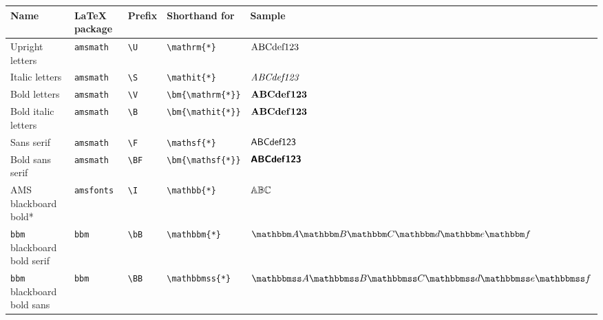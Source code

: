 \documentclass[]{article}
\begin{document}
\begin{table}[htbp]
  \hspace{-1.8cm}
  \begin{tabular}{p{14em} l l l l}
    \toprule
    Name & \LaTeX{} package & Prefix & Shorthand for & Sample \\
    \midrule
    Upright letters & \texttt{amsmath} & \verb+\U+ & \verb+\mathrm{*}+ & $\mathrm{A}\mathrm{B}\mathrm{C}\mathrm{d}\mathrm{e}\mathrm{f}\mathrm{1}\mathrm{2}\mathrm{3}$\\
    Italic letters & \texttt{amsmath} & \verb+\S+ & \verb+\mathit{*}+ & $\mathit{A}\mathit{B}\mathit{C}\mathit{d}\mathit{e}\mathit{f}\mathit{1}\mathit{2}\mathit{3}$ \\
    Bold letters & \texttt{amsmath} & \verb+\V+ & \verb+\bm{\mathrm{*}}+ & $\bm{\mathrm{A}}\bm{\mathrm{B}}\bm{\mathrm{C}}\bm{\mathrm{d}}\bm{\mathrm{e}}\bm{\mathrm{f}}\bm{\mathrm{1}}\bm{\mathrm{2}}\bm{\mathrm{3}}$ \\
    Bold italic letters & \texttt{amsmath} & \verb+\B+ & \verb+\bm{\mathit{*}}+ & $\bm{\mathrm{A}}\bm{\mathrm{B}}\bm{\mathrm{C}}\bm{\mathrm{d}}\bm{\mathrm{e}}\bm{\mathrm{f}}\bm{\mathrm{1}}\bm{\mathrm{2}}\bm{\mathrm{3}}$ \\
    Sans serif & \texttt{amsmath} & \verb+\F+ & \verb+\mathsf{*}+ & $\mathsf{A}\mathsf{B}\mathsf{C}\mathsf{d}\mathsf{e}\mathsf{f}\mathsf{1}\mathsf{2}\mathsf{3}$\\
    Bold sans serif & \texttt{amsmath} & \verb+\BF+ & \verb+\bm{\mathsf{*}}+ & $\bm{\mathsf{A}}\bm{\mathsf{B}}\bm{\mathsf{C}}\bm{\mathsf{d}}\bm{\mathsf{e}}\bm{\mathsf{f}}\bm{\mathsf{1}}\bm{\mathsf{2}}\bm{\mathsf{3}}$\\
    AMS blackboard bold* & \texttt{amsfonts} & \verb+\I+ & \verb+\mathbb{*}+ &
                                                                               $\mathbb{A}\mathbb{B}\mathbb{C}$ \\ %
    \texttt{bbm} blackboard bold serif & \texttt{bbm} & \verb+\bB+ & \verb+\mathbbm{*}+ & $\bBA\bBB\bBC\bBd\bBe\bBf$\\
    \texttt{bbm} blackboard bold sans & \texttt{bbm} & \verb+\BB+ & \verb+\mathbbmss{*}+ & $\BBA\BBB\BBC\BBd\BBe\BBf$ \\

\end{tabular}
\end{table}
\end{document}
